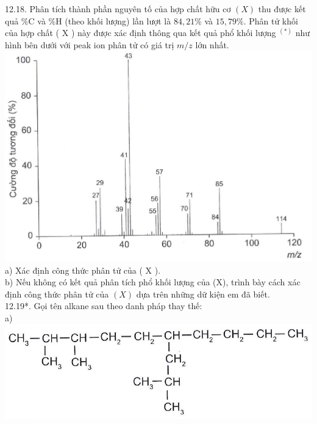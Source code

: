 \documentclass[10pt]{article}
\begin{document}
12.18. Phân tích thành phần nguyên tố của hợp chất hữu cơ $(X)$ thu được kết quả \%C và \%H (theo khối lượng) lần lượt là $84,21 \%$ và $15,79 \%$. Phân tử khối của hợp chất ( X ) này được xác định thông qua kết quả phổ khối lượng ${ }^{(*)}$ như hình bên dưới với peak ion phân tử có giá trị $m / z$ lớn nhất.\\
\includegraphics[max width=\textwidth, center]{2025_10_23_ae7aef68fb3b41082d29g-25}\\
a) Xác định công thức phân tử của ( X ).\\
b) Nếu không có kết quả phân tích phổ khối lượng của (X), trình bày cách xác định công thức phân tử của $(X)$ dựa trên những dữ kiện em đã biết.\\
12.19*. Gọi tên alkane sau theo danh pháp thay thế:\\
a)\\
\includegraphics[max width=\textwidth, center]{2025_10_23_ae7aef68fb3b41082d29g-25(1)}
\end{document}
